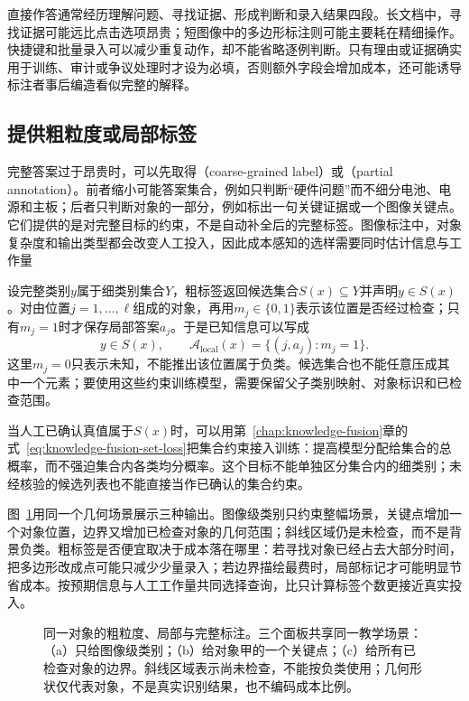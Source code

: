 直接作答通常经历理解问题、寻找证据、形成判断和录入结果四段。长文档中，寻找证据可能远比点击选项昂贵；短图像中的多边形标注则可能主要耗在精细操作。快捷键和批量录入可以减少重复动作，却不能省略逐例判断。只有理由或证据确实用于训练、审计或争议处理时才设为必填，否则额外字段会增加成本，还可能诱导标注者事后编造看似完整的解释。

\subsection{提供粗粒度或局部标签}
\label{sec:knowledge-acquisition-human-partial-label}

完整答案过于昂贵时，可以先取得（coarse-grained label）或（partial annotation）。前者缩小可能答案集合，例如只判断“硬件问题”而不细分电池、电源和主板；后者只判断对象的一部分，例如标出一句关键证据或一个图像关键点。它们提供的是对完整目标的约束，不是自动补全后的完整标签。图像标注中，对象复杂度和输出类型都会改变人工投入，因此成本感知的选样需要同时估计信息与工作量

设完整类别$y$属于细类别集合$Y$，粗标签返回候选集合$S(x)\subseteq Y$并声明$y\in S(x)$。对由位置$j=1,\ldots,\ell$组成的对象，再用$m_j\in\{0,1\}$表示该位置是否经过检查；只有$m_j=1$时才保存局部答案$a_j$。于是已知信息可以写成
\begin{equation}
  y\in S(x),
  \qquad
  \mathcal{A}_{\mathrm{local}}(x)
  =\{(j,a_j):m_j=1\}.
  \label{eq:knowledge-acquisition-human-partial-label}
\end{equation}
这里$m_j=0$只表示未知，不能推出该位置属于负类。候选集合也不能任意压成其中一个元素；要使用这些约束训练模型，需要保留父子类别映射、对象标识和已检查范围。

当人工已确认真值属于$S(x)$时，可以用第~\ref{chap:knowledge-fusion}章的式~\eqref{eq:knowledge-fusion-set-loss}把集合约束接入训练：提高模型分配给集合的总概率，而不强迫集合内各类均分概率。这个目标不能单独区分集合内的细类别；未经核验的候选列表也不能直接当作已确认的集合约束。

图~\ref{fig:knowledge-acquisition-human-granularity}用同一个几何场景展示三种输出。图像级类别只约束整幅场景，关键点增加一个对象位置，边界又增加已检查对象的几何范围；斜线区域仍是未检查，而不是背景负类。粗标签是否便宜取决于成本落在哪里：若寻找对象已经占去大部分时间，把多边形改成点可能只减少少量录入；若边界描绘最费时，局部标记才可能明显节省成本。按预期信息与人工工作量共同选择查询，比只计算标签个数更接近真实投入。

\begin{figure}[htbp]
  \centering
  
  \caption{同一对象的粗粒度、局部与完整标注。三个面板共享同一教学场景：（a）只给图像级类别；（b）给对象甲的一个关键点；（c）给所有已检查对象的边界。斜线区域表示尚未检查，不能按负类使用；几何形状仅代表对象，不是真实识别结果，也不编码成本比例。}
  \label{fig:knowledge-acquisition-human-granularity}
\end{figure}

